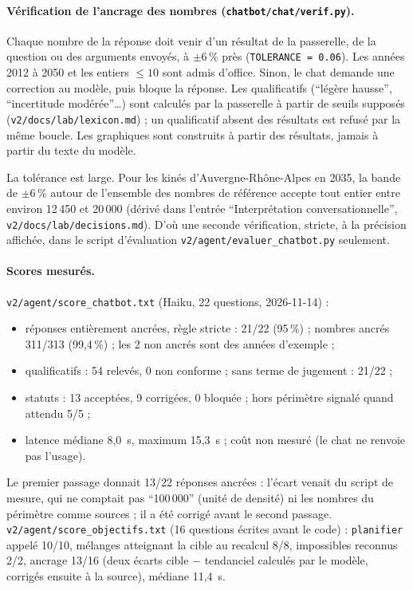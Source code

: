 \paragraph{Vérification de l'ancrage des nombres (\texttt{chatbot/\allowbreak{}chat/\allowbreak{}verif.py}).}
Chaque nombre de la réponse doit venir d'un résultat de la passerelle, de la question ou des arguments envoyés, à $\pm6$\mesure{}\,\% près (\texttt{TOLERANCE = 0.06}).
Les années 2012 à 2050 et les entiers $\leq 10$\mesure{} sont admis d'office.
Sinon, le chat demande une correction au modèle, puis bloque la réponse.
Les qualificatifs (\enquote{légère hausse}, \enquote{incertitude modérée}\ldots{}) sont calculés par la passerelle à partir de seuils supposés (\texttt{v2/\allowbreak{}docs/\allowbreak{}lab/\allowbreak{}lexicon.md}) ; un qualificatif absent des résultats est refusé par la même boucle.
Les graphiques sont construits à partir des résultats, jamais à partir du texte du modèle.

La tolérance est large. Pour les kinés d'Auvergne-Rhône-Alpes en 2035, la bande de $\pm6$\,\% autour de l'ensemble des nombres de référence accepte tout entier entre environ 12\,450\derive{} et 20\,000\derive{} (dérivé dans l'entrée \enquote{Interprétation conversationnelle}, \texttt{v2/\allowbreak{}docs/\allowbreak{}lab/\allowbreak{}decisions.md}).
D'où une seconde vérification, stricte, à la précision affichée, dans le script d'évaluation \texttt{v2/\allowbreak{}agent/\allowbreak{}evaluer\_\allowbreak{}chatbot.py} seulement.

\paragraph{Scores mesurés.}
\texttt{v2/\allowbreak{}agent/\allowbreak{}score\_\allowbreak{}chatbot.txt} (Haiku, 22\mesure{} questions, 2026-11-14) :
\begin{itemize}
\item réponses entièrement ancrées, règle stricte : 21/22\mesure{} (95\,\%) ; nombres ancrés 311/313\mesure{} (99,4\,\%) ; les 2\mesure{} non ancrés sont des années d'exemple ;
\item qualificatifs : 54\mesure{} relevés, 0\mesure{} non conforme ; sans terme de jugement : 21/22\mesure{} ;
\item statuts : 13\mesure{} acceptées, 9\mesure{} corrigées, 0\mesure{} bloquée ; hors périmètre signalé quand attendu 5/5\mesure{} ;
\item latence médiane 8,0\mesure{}~s, maximum 15,3\mesure{}~s ; coût non mesuré (le chat ne renvoie pas l'usage).
\end{itemize}
Le premier passage donnait 13/22\mesure{} réponses ancrées : l'écart venait du script de mesure, qui ne comptait pas \enquote{100\,000} (unité de densité) ni les nombres du périmètre comme sources ; il a été corrigé avant le second passage.
\texttt{v2/\allowbreak{}agent/\allowbreak{}score\_\allowbreak{}objectifs.txt} (16\mesure{} questions écrites avant le code) : \texttt{planifier} appelé 10/10\mesure{}, mélanges atteignant la cible au recalcul 8/8\mesure{}, impossibles reconnus 2/2\mesure{}, ancrage 13/16\mesure{} (deux écarts cible $-$ tendanciel calculés par le modèle, corrigés ensuite à la source), médiane 11,4\mesure{}~s.

